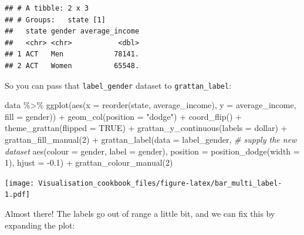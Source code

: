 \documentclass[
]{book}
\newenvironment{Shaded}{\begin{snugshade}}{\end{snugshade}}
\newcommand{\AttributeTok}[1]{\textcolor[rgb]{0.77,0.63,0.00}{#1}}
\newcommand{\CommentTok}[1]{\textcolor[rgb]{0.56,0.35,0.01}{\textit{#1}}}
\newcommand{\ConstantTok}[1]{\textcolor[rgb]{0.00,0.00,0.00}{#1}}
\newcommand{\DecValTok}[1]{\textcolor[rgb]{0.00,0.00,0.81}{#1}}
\newcommand{\FloatTok}[1]{\textcolor[rgb]{0.00,0.00,0.81}{#1}}
\newcommand{\FunctionTok}[1]{\textcolor[rgb]{0.00,0.00,0.00}{#1}}
\newcommand{\NormalTok}[1]{#1}
\newcommand{\SpecialCharTok}[1]{\textcolor[rgb]{0.00,0.00,0.00}{#1}}
\newcommand{\StringTok}[1]{\textcolor[rgb]{0.31,0.60,0.02}{#1}}
\begin{document}
\begin{verbatim}
## # A tibble: 2 x 3
## # Groups:   state [1]
##   state gender average_income
##   <chr> <chr>           <dbl>
## 1 ACT   Men            78141.
## 2 ACT   Women          65548.
\end{verbatim}

So you can pass that \texttt{label\_gender} dataset to \texttt{grattan\_label}:

\begin{Shaded}
\begin{Highlighting}[]
\NormalTok{data }\SpecialCharTok{\%\textgreater{}\%} 
  \FunctionTok{ggplot}\NormalTok{(}\FunctionTok{aes}\NormalTok{(}\AttributeTok{x =} \FunctionTok{reorder}\NormalTok{(state, average\_income), }
             \AttributeTok{y =}\NormalTok{ average\_income,}
             \AttributeTok{fill =}\NormalTok{ gender)) }\SpecialCharTok{+} 
  \FunctionTok{geom\_col}\NormalTok{(}\AttributeTok{position =} \StringTok{"dodge"}\NormalTok{) }\SpecialCharTok{+} 
  \FunctionTok{coord\_flip}\NormalTok{() }\SpecialCharTok{+} 
  \FunctionTok{theme\_grattan}\NormalTok{(}\AttributeTok{flipped =} \ConstantTok{TRUE}\NormalTok{) }\SpecialCharTok{+} 
  \FunctionTok{grattan\_y\_continuous}\NormalTok{(}\AttributeTok{labels =}\NormalTok{ dollar) }\SpecialCharTok{+} 
  \FunctionTok{grattan\_fill\_manual}\NormalTok{(}\DecValTok{2}\NormalTok{) }\SpecialCharTok{+} 
  \FunctionTok{grattan\_label}\NormalTok{(}\AttributeTok{data =}\NormalTok{ label\_gender,  }\CommentTok{\# supply the new dataset}
                \FunctionTok{aes}\NormalTok{(}\AttributeTok{colour =}\NormalTok{ gender,}
                    \AttributeTok{label =}\NormalTok{ gender), }
                \AttributeTok{position =} \FunctionTok{position\_dodge}\NormalTok{(}\AttributeTok{width =} \DecValTok{1}\NormalTok{), }
                \AttributeTok{hjust =} \SpecialCharTok{{-}}\FloatTok{0.1}\NormalTok{) }\SpecialCharTok{+} 
  \FunctionTok{grattan\_colour\_manual}\NormalTok{(}\DecValTok{2}\NormalTok{)}
\end{Highlighting}
\end{Shaded}

\texttt{[image: Visualisation\_cookbook\_files/figure-latex/bar\_multi\_label-1.pdf]}

Almost there! The labels go out of range a little bit, and we can fix this by expanding the plot:
\end{document}
